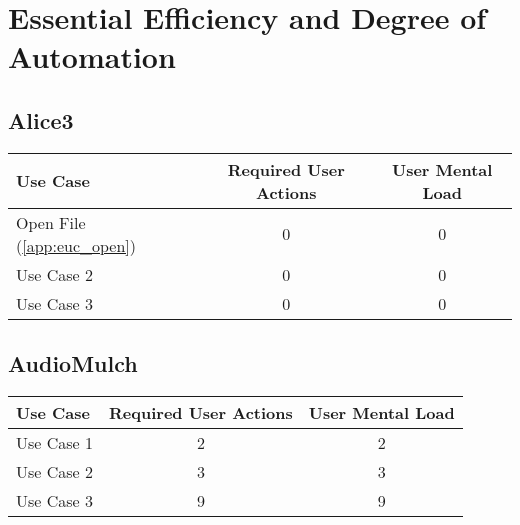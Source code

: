 \section{Essential Efficiency and Degree of Automation}

\subsection{Alice3}

\begin{tabularx}{\textwidth}{Xcc}
\textbf{Use Case} & \textbf{Required User Actions} & \textbf{User Mental Load}\\
\hline
Open File (\ref{app:euc_open}) & 0 & 0 \\
Use Case 2                     & 0 & 0 \\
Use Case 3                     & 0 & 0
\end{tabularx}

\subsection{AudioMulch}




\begin{tabularx}{\textwidth}{Xcc}
\textbf{Use Case} & \textbf{Required User Actions} & \textbf{User Mental Load}\\
\hline
Use Case 1                          & 2 & 2 \\
Use Case 2                          & 3 & 3 \\
Use Case 3                          & 9 & 9
\end{tabularx}

